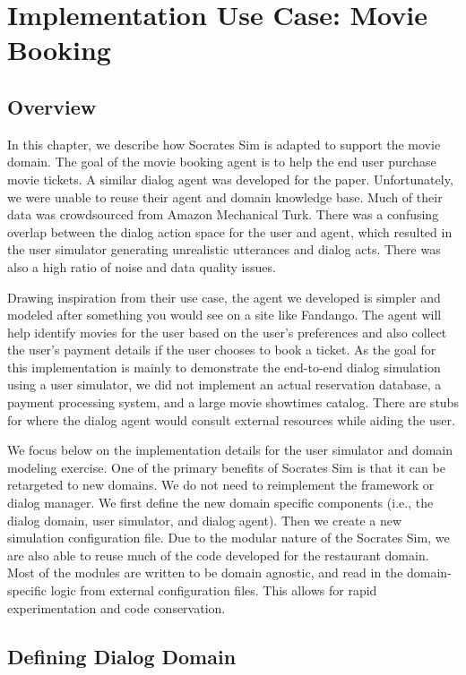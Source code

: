 \chapter{Implementation Use Case:  Movie Booking}
\label{chap:movie}

\section{Overview}
In this chapter, we describe how Socrates Sim is adapted to support the movie domain. The goal of the movie booking agent is to help the end user purchase movie tickets. A similar dialog agent was developed for the \cite{li_usersim} paper. Unfortunately, we were unable to reuse their agent and domain knowledge base. Much of their data was crowdsourced from Amazon Mechanical Turk. There was a confusing overlap between the dialog action space for the user and agent, which resulted in the user simulator generating unrealistic utterances and dialog acts. There was also a high ratio of noise and data quality issues.  

Drawing inspiration from their use case, the agent we developed is simpler and modeled after something you would see on a site like Fandango. The agent will help identify movies for the user based on the user's preferences and also collect the user's payment details if the user chooses to book a ticket. As the goal for this implementation is mainly to demonstrate the end-to-end dialog simulation using a user simulator, we did not implement an actual reservation database, a payment processing system, and a large movie showtimes catalog. There are stubs for where the dialog agent would consult external resources while aiding the user. 

We focus below on the implementation details for the user simulator and domain modeling exercise. One of the primary benefits of Socrates Sim is that it can be retargeted to new domains. We do not need to reimplement the framework or dialog manager. We first define the new domain specific components (i.e., the dialog domain, user simulator, and dialog agent). Then we create a new simulation configuration file. Due to the modular nature of the Socrates Sim, we are also able to reuse much of the code developed for the restaurant domain. Most of the modules are written to be domain agnostic, and read in the domain-specific logic from external configuration files. This allows for rapid experimentation and code conservation.

\section{Defining Dialog Domain}

